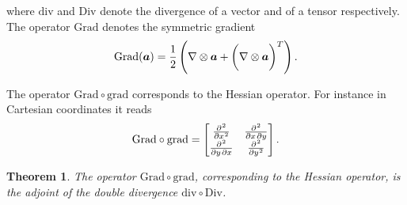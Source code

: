 \documentclass[preprint,12pt]{elsarticle}
\newcommand{\tens}[1]{%
	\mathbin{\mathop{\otimes}\displaylimits_{#1}}%
}
\newtheorem{theorem}{Theorem}
\begin{document}
	
	where $\mathrm{div}$ and $\mathrm{Div}$ denote the divergence of a vector and of a tensor respectively. The operator $\mathrm{Grad}$ denotes the symmetric gradient
	\begin{equation}
	\mathrm{Grad}(\bm{a}) =  \frac{1}{2} \left(\nabla \tens{} \bm{a} + \left(\nabla \tens{} \bm{a}\right)^T \right).
	\end{equation}

The operator $\mathrm{Grad} \circ \mathrm{grad}$ corresponds to the Hessian operator. For instance in Cartesian coordinates it reads
\begin{equation}
\mathrm{Grad} \circ \mathrm{grad} = 
\begin{bmatrix}
\diffp[2]{}{x}  &  \diffp{}{x,y} \\
\diffp{}{y,x}   &  \diffp[2]{}{y} \\
\end{bmatrix}.
\end{equation}
	
	\begin{theorem}
	The operator $\mathrm{Grad} \circ \mathrm{grad}$, corresponding to the Hessian operator, is the adjoint of the double divergence $\mathrm{div} \circ \mathrm{Div}$.
	\end{theorem}
\end{document}
